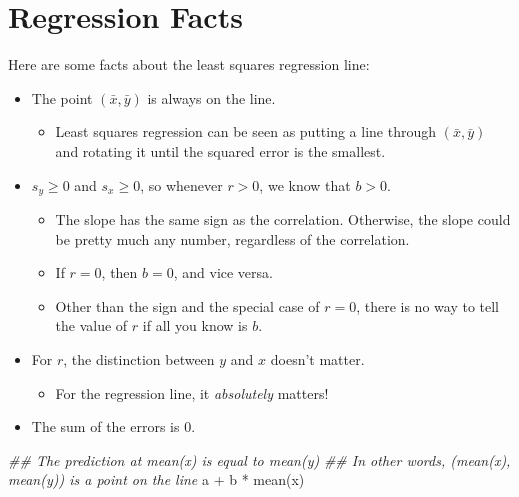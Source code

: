 \documentclass[
  letterpaper,
  DIV=11,
  numbers=noendperiod]{scrreprt}
\newenvironment{Shaded}{\begin{snugshade}}{\end{snugshade}}
\newcommand{\DocumentationTok}[1]{\textcolor[rgb]{0.37,0.37,0.37}{\textit{#1}}}
\newcommand{\FunctionTok}[1]{\textcolor[rgb]{0.28,0.35,0.67}{#1}}
\newcommand{\NormalTok}[1]{\textcolor[rgb]{0.00,0.23,0.31}{#1}}
\newcommand{\SpecialCharTok}[1]{\textcolor[rgb]{0.37,0.37,0.37}{#1}}
\providecommand{\tightlist}{%
  \setlength{\itemsep}{0pt}\setlength{\parskip}{0pt}}\usepackage{longtable,booktabs,array}
\begin{document}
\hypertarget{regression-facts}{%
\section{Regression Facts}\label{regression-facts}}

Here are some facts about the least squares regression line:

\begin{itemize}
\tightlist
\item
  The point \((\bar x, \bar y)\) is always on the line.

  \begin{itemize}
  \tightlist
  \item
    Least squares regression can be seen as putting a line through
    \((\bar x, \bar y)\) and rotating it until the squared error is the
    smallest.
  \end{itemize}
\item
  \(s_y\ge 0\) and \(s_x\ge 0\), so whenever \(r > 0\), we know that
  \(b > 0\).

  \begin{itemize}
  \tightlist
  \item
    The slope has the same sign as the correlation. Otherwise, the slope
    could be pretty much any number, regardless of the correlation.
  \item
    If \(r = 0\), then \(b = 0\), and vice versa.
  \item
    Other than the sign and the special case of \(r=0\), there is no way
    to tell the value of \(r\) if all you know is \(b\).
  \end{itemize}
\item
  For \(r\), the distinction between \(y\) and \(x\) doesn't matter.

  \begin{itemize}
  \tightlist
  \item
    For the regression line, it \emph{absolutely} matters!
  \end{itemize}
\item
  The sum of the errors is 0.
\end{itemize}

\begin{Shaded}
\begin{Highlighting}[]
\DocumentationTok{\#\# The prediction at mean(x) is equal to mean(y)}
\DocumentationTok{\#\# In other words, (mean(x), mean(y)) is a point on the line}
\NormalTok{a }\SpecialCharTok{+}\NormalTok{ b }\SpecialCharTok{*} \FunctionTok{mean}\NormalTok{(x)}
\end{Highlighting}
\end{Shaded}
\end{document}
